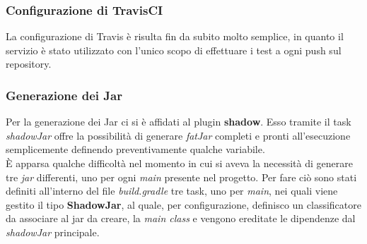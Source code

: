 	\subsubsection{Configurazione di TravisCI}
	  La configurazione di Travis è risulta fin da subito molto semplice, in quanto il servizio è stato utilizzato con l'unico scopo di effettuare i test a ogni push sul repository.

	\subsubsection{Generazione dei Jar}
	  Per la generazione dei Jar ci si è affidati al plugin \textbf{shadow}. Esso tramite il task \textit{shadowJar}
	  offre la possibilità di generare \textit{fatJar} completi e pronti all'esecuzione semplicemente definendo preventivamente qualche variabile. \\
	  È apparsa qualche difficoltà nel momento in cui si aveva la necessità di generare tre \textit{jar} differenti, uno per ogni \textit{main} presente nel progetto.
	  Per fare ciò sono stati definiti all'interno del file \textit{build.gradle} tre task, uno per \textit{main}, nei quali viene gestito il tipo \textbf{ShadowJar},
	  al quale, per configurazione, definisco un classificatore da associare al jar da creare, la \textit{main class}
	  e vengono ereditate le dipendenze dal \textit{shadowJar} principale.

